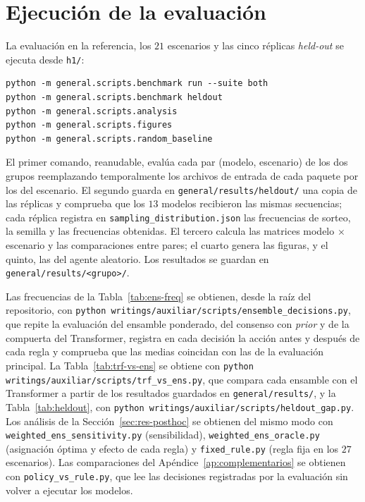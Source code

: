 \documentclass[../00_Main/Main.tex]{subfiles}
\begin{document}
\section{Ejecuci\'on de la evaluaci\'on}\label{ap:orchestrator}

La evaluaci\'on en la referencia, los $21$ escenarios y las cinco r\'eplicas \emph{held-out} se ejecuta desde \texttt{h1/}:

\begin{verbatim}
python -m general.scripts.benchmark run --suite both
python -m general.scripts.benchmark heldout
python -m general.scripts.analysis
python -m general.scripts.figures
python -m general.scripts.random_baseline
\end{verbatim}

El primer comando, reanudable, eval\'ua cada par (modelo, escenario) de
los dos grupos reemplazando temporalmente los archivos de entrada de
cada paquete por los del escenario. El segundo guarda en
\texttt{general/results/heldout/} una copia de las r\'eplicas y comprueba
que los $13$ modelos recibieron las mismas secuencias; cada r\'eplica
registra en \texttt{sampling\_distribution.json} las frecuencias de
sorteo, la semilla y las frecuencias obtenidas. El tercero
calcula las matrices modelo $\times$ escenario y las comparaciones entre
pares; el cuarto genera las figuras, y el quinto, las del agente
aleatorio. Los resultados se guardan en
\texttt{general/results/<grupo>/}.

Las frecuencias de la Tabla~\ref{tab:ens-freq} se obtienen, desde la
ra\'iz del repositorio, con
\texttt{python writings/auxiliar/scripts/ensemble\_decisions.py}, que
repite la evaluaci\'on del ensamble ponderado, del consenso con
\emph{prior} y de la compuerta del Transformer, registra en cada decisi\'on
la acci\'on antes y despu\'es de cada regla y comprueba que las medias
coincidan con las de la evaluaci\'on principal. La
Tabla~\ref{tab:trf-vs-ens} se obtiene con
\texttt{python writings/auxiliar/scripts/trf\_vs\_ens.py}, que compara
cada ensamble con el Transformer a partir de los resultados guardados en
\texttt{general/results/}, y la Tabla~\ref{tab:heldout}, con
\texttt{python writings/auxiliar/scripts/heldout\_gap.py}. Los
an\'alisis de la Secci\'on~\ref{sec:res-posthoc} se obtienen del mismo
modo con \texttt{weighted\_ens\_sensitivity.py} (sensibilidad),
\texttt{weighted\_ens\_oracle.py} (asignaci\'on \'optima y efecto de cada
regla) y \texttt{fixed\_rule.py} (regla fija en los $27$ escenarios). Las
comparaciones del Ap\'endice~\ref{ap:complementarios} se obtienen con
\texttt{policy\_vs\_rule.py}, que lee las decisiones registradas por la
evaluaci\'on sin volver a ejecutar los modelos.
\end{document}
